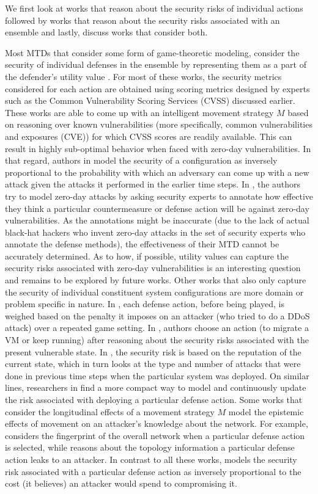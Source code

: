 We first look at works that reason about the security risks of individual actions followed by works that reason about the security risks associated with an ensemble and lastly, discuss works that consider both.

Most MTDs that consider some form of game-theoretic modeling, consider the security of individual defenses in the ensemble by representing them as a part of the defender's utility value . For most of these works, the security metrics considered for each action are obtained using scoring metrics designed by experts such as the Common Vulnerability Scoring Services (CVSS) discussed earlier. These works are able to come up with an intelligent movement strategy $M$ based on reasoning over known vulnerabilities (more specifically, common vulnerabilities and exposures (CVE)) for which CVSS scores are readily available. This can result in highly sub-optimal behavior when faced with zero-day vulnerabilities. In that regard, authors in  model the security of a configuration as inversely proportional to the probability with which an adversary can come up with a new attack given the attacks it performed in the earlier time steps. In , the authors try to model zero-day attacks by asking security experts to annotate how effective they think a particular {countermeasure} or defense action will be against zero-day vulnerabilities. As the annotations might be inaccurate (due to the lack of actual black-hat hackers who invent zero-day attacks in the set of security experts who annotate the defense methods), the effectiveness of their MTD cannot be accurately determined. As to how, if possible, utility values can capture the security risks associated with zero-day vulnerabilities is an interesting question and remains to be explored by future works.
Other works that also only capture the security of individual constituent system configurations are more domain or problem specific in nature. In , each defense action, before being played, is weighed based on the penalty it imposes on an attacker (who tried to do a DDoS attack) over a repeated game setting. In , authors choose an action (to migrate a VM or keep running) after reasoning about the security risks associated with the present vulnerable state. In , the security risk is based on the reputation of the current state, which in turn looks at the type and number of attacks that were done in previous time steps when the particular system was deployed. On similar lines, researchers in  find a more compact way to model and continuously update the risk associated with deploying a particular defense action. Some works that consider the longitudinal effects of a movement strategy $M$ model the epistemic effects of movement on an attacker's knowledge about the network. For example,  considers the fingerprint of the overall {network} when a particular defense action is selected, while  reasons about the topology information a particular defense action leaks to an attacker. In contrast to all these works,  models the security risk associated with a particular defense action as inversely proportional to the cost (it believes) an attacker would spend to compromising it.

